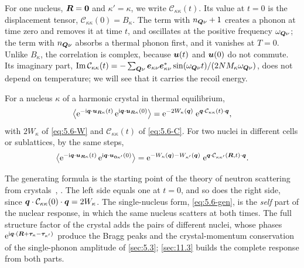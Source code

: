 For one nucleus, $\bm{R} = \bm{0}$ and $\kappa' = \kappa$, we write $\mathcal{C}_{\kappa\kappa}(t)$. Its value at $t = 0$ is the displacement tensor, $\mathcal{C}_{\kappa\kappa}(0) = B_\kappa$. The term with $n_{\bm{Q}\nu} + 1$ creates a phonon at time zero and removes it at time $t$, and oscillates at the positive frequency $\omega_{\bm{Q}\nu}$; the term with $n_{\bm{Q}\nu}$ absorbs a thermal phonon first, and it vanishes at $T = 0$. Unlike $B_\kappa$, the correlation is complex, because $\bm{u}(t)$ and $\bm{u}(0)$ do not commute. Its imaginary part, $\operatorname{Im}\mathcal{C}_{\kappa\kappa}(t) = -\sum_{\bm{Q}\nu}\bm{e}_{\kappa\nu}\bm{e}^*_{\kappa\nu}\sin(\omega_{\bm{Q}\nu}t)/(2NM_\kappa\omega_{\bm{Q}\nu})$, does not depend on temperature; we will see that it carries the recoil energy.
\begin{keyresult}
For a nucleus $\kappa$ of a harmonic crystal in thermal equilibrium,
\begin{equation}
  \bigl\langle\mathrm{e}^{-\mathrm{i}\bm{q}\cdot\bm{u}_{\bm{R}\kappa}(t)}\,\mathrm{e}^{\mathrm{i}\bm{q}\cdot\bm{u}_{\bm{R}\kappa}(0)}\bigr\rangle
  = \mathrm{e}^{-2W_\kappa(\bm{q})}\;\mathrm{e}^{\bm{q}\cdot\mathcal{C}_{\kappa\kappa}(t)\cdot\bm{q}} ,
  \label{eq:5.6-gen}
\end{equation}
with $2W_\kappa$ of \cref{eq:5.6-W} and $\mathcal{C}_{\kappa\kappa}(t)$ of \cref{eq:5.6-C}. For two nuclei in different cells or sublattices, by the same steps,
\begin{equation}
  \bigl\langle\mathrm{e}^{-\mathrm{i}\bm{q}\cdot\bm{u}_{\bm{R}\kappa}(t)}\,\mathrm{e}^{\mathrm{i}\bm{q}\cdot\bm{u}_{\bm{0}\kappa'}(0)}\bigr\rangle = \mathrm{e}^{-W_\kappa(\bm{q}) - W_{\kappa'}(\bm{q})}\;\mathrm{e}^{\bm{q}\cdot\mathcal{C}_{\kappa\kappa'}(\bm{R},t)\cdot\bm{q}} .
  \label{eq:D.15-gen}
\end{equation}
\end{keyresult}
The generating formula is the starting point of the theory of neutron scattering from crystals~\cite[App.~N]{ashcroft1976solid}, \cite[Chaps.~3 and~4]{lovesey1984theorynuclear}.
The left side equals one at $t = 0$, and so does the right side, since $\bm{q}\cdot\mathcal{C}_{\kappa\kappa}(0)\cdot\bm{q} = 2W_\kappa$. The single-nucleus form, \cref{eq:5.6-gen}, is the \emph{self} part of the nuclear response, in which the same nucleus scatters at both times. The full structure factor of the crystal adds the pairs of different nuclei, whose phases $\mathrm{e}^{\mathrm{i}\bm{q}\cdot(\bm{R} + \bm{\tau}_\kappa - \bm{\tau}_{\kappa'})}$ produce the Bragg peaks and the crystal-momentum conservation of the single-phonon amplitude of \cref{sec:5.3}; \cref{sec:11.3} builds the complete response from both parts.

